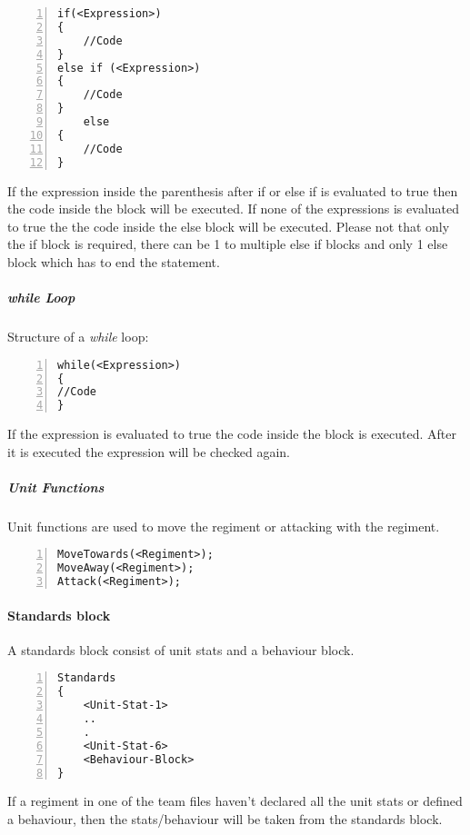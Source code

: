 		\begin{lstlisting}[basicstyle=\small\sffamily,
		keywordstyle={\color{blue}},
		comment={[l]{//}}, morecomment={[s]{/*}{*/}}, commentstyle=\itshape,
		columns={[l]flexible}, numbers=left, numberstyle=\tiny,
		frameround=fftt, frame=shadowbox, captionpos=b,
		caption={if and else if statements}]
if(<Expression>)
{
	//Code
}
else if (<Expression>)
{
	//Code
}
	else
{
	//Code
}
			\end{lstlisting}
			If the expression inside the parenthesis after if or else if is evaluated to true then the code inside the block will be executed.
			If none of the expressions is evaluated to true the the code inside the else block will be executed. Please not that only the if block
			is required, there can be 1 to multiple else if blocks and only 1 else block which has to end the statement. \\
		\subparagraph{while Loop}
			Structure of a {\it while} loop: \\			

		\begin{lstlisting}[basicstyle=\small\sffamily,
		keywordstyle={\color{blue}},
		comment={[l]{//}}, morecomment={[s]{/*}{*/}}, commentstyle=\itshape,
		columns={[l]flexible}, numbers=left, numberstyle=\tiny,
		frameround=fftt, frame=shadowbox, captionpos=b,
		caption={While loop}]
while(<Expression>)
{
//Code
}
			\end{lstlisting}
			If the expression is evaluated to true the code inside the block is executed. After it is executed the expression will be checked again.
		\subparagraph{Unit Functions}
			Unit functions are used to move the regiment or attacking with the regiment.

		\begin{lstlisting}[basicstyle=\small\sffamily,
		keywordstyle={\color{blue}},
		comment={[l]{//}}, morecomment={[s]{/*}{*/}}, commentstyle=\itshape,
		columns={[l]flexible}, numbers=left, numberstyle=\tiny,
		frameround=fftt, frame=shadowbox, captionpos=b,
		caption={Unit functions}]
MoveTowards(<Regiment>);
MoveAway(<Regiment>);
Attack(<Regiment>);
			\end{lstlisting}
	\paragraph{Standards block}
		A standards block consist of unit stats and a behaviour block. 

		\begin{lstlisting}[basicstyle=\small\sffamily,
		keywordstyle={\color{blue}},
		comment={[l]{//}}, morecomment={[s]{/*}{*/}}, commentstyle=\itshape,
		columns={[l]flexible}, numbers=left, numberstyle=\tiny,
		frameround=fftt, frame=shadowbox, captionpos=b,
		caption={Standards block}]
Standards
{
	<Unit-Stat-1>
	..
	.
	<Unit-Stat-6>
	<Behaviour-Block>
}
		\end{lstlisting}
		If a regiment in one of the team files haven't declared all the unit stats
		or defined a behaviour, then the stats/behaviour will be taken from the standards block.
